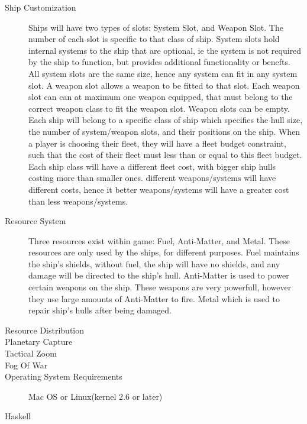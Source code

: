 \begin{description}
\item[Ship Customization]
Ships will have two types of slots: System Slot, and Weapon Slot.
The number of each slot is specific to that class of ship.
System slots hold internal systems to the ship that are optional, ie the system is not required by the ship to function, but provides additional functionality or benefts.
All system slots are the same size, hence any system can fit in any system slot.
A weapon slot allows a weapon to be fitted to that slot.
Each weapon slot can can at maximum one weapon equipped, that must belong to the correct weapon class to fit the weapon slot.
Weapon slots can be empty.
Each ship will belong to a specific class of ship which specifies the hull size, the number of system/weapon slots, and their positions on the ship.
When a player is choosing their fleet, they will have a fleet budget constraint, such that the cost of their fleet must less than or equal to this fleet budget.
Each ship class will have a different fleet cost, with bigger ship hulls costing more than smaller ones.
different weapons/systems will have different costs, hence it better weapons/systems will have a greater cost than less weapons/systems.


\item[Resource System]
Three resources exist within game: Fuel, Anti-Matter, and Metal.
These resources are only used by the ships, for different purposes.
Fuel maintains the ship's shields, without fuel, the ship will have no shields, and any damage will be directed to the ship's hull.
Anti-Matter is used to power certain weapons on the ship. These weapons are very powerfull, however they use large amounts of Anti-Matter to fire.
Metal which is used to repair ship's hulls after being damaged.


\item[Resource Distribution]







\item[Planetary Capture]


\item[Tactical Zoom]

\item[Fog Of War]

\item[Operating System Requirements]
Mac OS or Linux(kernel 2.6 or later) 

\item[Haskell]

\end{description}

